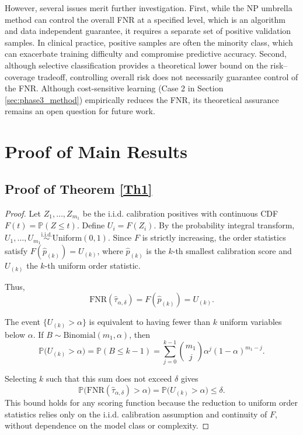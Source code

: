 \documentclass[journal]{IEEEtran}
\theoremstyle{remark}
\begin{document}
However, several issues merit further investigation. First, while the NP umbrella method can control the overall FNR at a specified level, which is an algorithm and data independent guarantee, it requires a separate set of positive validation samples. In clinical practice, positive samples are often the minority class, which can exacerbate training difficulty and compromise predictive accuracy. Second, although selective classification provides a theoretical lower bound on the risk–coverage tradeoff, controlling overall risk does not necessarily guarantee control of the FNR. Although cost-sensitive learning (Case 2 in Section \ref{sec:phase3_method}) empirically reduces the FNR, its theoretical assurance remains an open question for future work.





\appendices


\section{Proof of Main Results}\label{S6}

\subsection{Proof of Theorem \ref{Th1}}\label{S6-1}

\begin{proof}
Let $Z_1, \dots, Z_{m_1}$ be the i.i.d. calibration positives with continuous CDF $F(t) = \mathbb{P}(Z \leq t)$. 
Define $U_i = F(Z_i)$. 
By the probability integral transform, $U_1, \dots, U_{m_1} \stackrel{\text{i.i.d.}}{\sim} \mathrm{Uniform}(0,1)$. 
Since $F$ is strictly increasing, the order statistics satisfy $F(\hat{p}_{(k)}) = U_{(k)}$, where $\hat{p}_{(k)}$ is the $k$-th smallest calibration score and $U_{(k)}$ the $k$-th uniform order statistic.  

Thus,
\[
\mathrm{FNR}(\hat{\tau}_{\alpha,\delta}) = F(\hat{p}_{(k)}) = U_{(k)}.
\]

The event $\{U_{(k)} > \alpha\}$ is equivalent to having fewer than $k$ uniform variables below $\alpha$. 
If $B \sim \mathrm{Binomial}(m_1, \alpha)$, then
\[
\mathbb{P}\bigl(U_{(k)} > \alpha\bigr) 
= \mathbb{P}(B \le k-1) 
= \sum_{j=0}^{k-1} \binom{m_1}{j} \alpha^j (1-\alpha)^{m_1-j}.
\]

Selecting $k$ such that this sum does not exceed $\delta$ gives
\[
\mathbb{P}\bigl(\mathrm{FNR}(\hat{\tau}_{\alpha,\delta}) > \alpha\bigr) = \mathbb{P}\bigl(U_{(k)} > \alpha\bigr) \le \delta.
\]
This bound holds for any scoring function because the reduction to uniform order statistics relies only on the i.i.d. calibration assumption and continuity of $F$, without dependence on the model class or complexity.
\end{proof}
\end{document}
